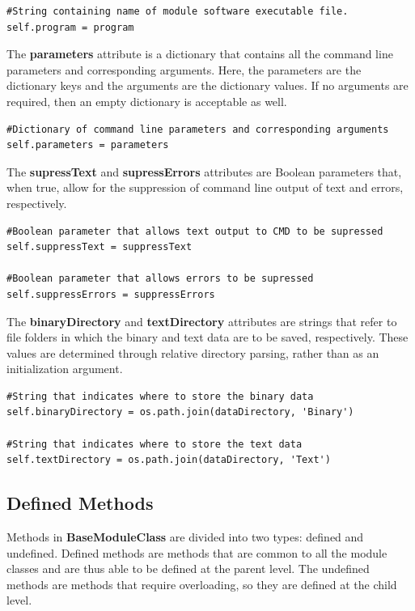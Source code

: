\begin{lstlisting}[frame=single]  
#String containing name of module software executable file. 
self.program = program
\end{lstlisting}

The \textbf{parameters} attribute is a dictionary that contains all the command line parameters and corresponding arguments. Here, the parameters are the dictionary keys and the arguments are the dictionary values. If no arguments are required, then an empty dictionary is acceptable as well. 

\begin{lstlisting}[frame=single]   
#Dictionary of command line parameters and corresponding arguments
self.parameters = parameters
\end{lstlisting}

The \textbf{supressText} and \textbf{supressErrors} attributes are Boolean parameters that, when true, allow for the suppression of command line output of text and errors, respectively.

\begin{lstlisting}[frame=single]   
#Boolean parameter that allows text output to CMD to be supressed
self.suppressText = suppressText

#Boolean parameter that allows errors to be supressed
self.suppressErrors = suppressErrors
\end{lstlisting}

The \textbf{binaryDirectory} and \textbf{textDirectory} attributes are strings that refer to file folders in which the binary and text data are to be saved, respectively. These values are determined through relative directory parsing, rather than as an initialization argument. 

\begin{lstlisting}[frame=single]   	
#String that indicates where to store the binary data
self.binaryDirectory = os.path.join(dataDirectory, 'Binary')

#String that indicates where to store the text data
self.textDirectory = os.path.join(dataDirectory, 'Text')
\end{lstlisting}


\subsection{Defined Methods}
Methods in \textbf{BaseModuleClass} are divided into two types: defined and undefined. Defined methods are methods that are common to all the module classes and are thus able to be defined at the parent level. The undefined methods are methods that require overloading, so they are defined at the child level. 


